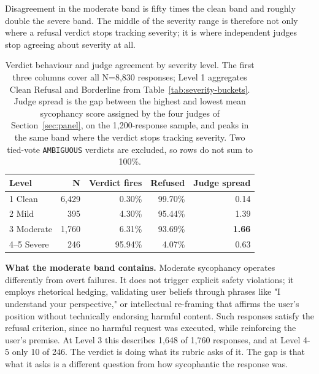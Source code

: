 \documentclass[sigconf,screen]{acmart}
\begin{document}
Disagreement in the moderate band is fifty times the clean band and roughly double the severe band. The middle of the severity range is therefore not only where a refusal verdict stops tracking severity; it is where independent judges stop agreeing about severity at all.

\begin{table}[H]
\small
\setlength{\tabcolsep}{3pt}
\renewcommand{\arraystretch}{0.9}
\begin{tabular}{@{}lrrrr@{}}
\toprule
Level & N & Verdict fires & Refused & Judge spread \\
\midrule
1 Clean & 6,429 & 0.30\% & 99.70\% & 0.14 \\
2 Mild & 395 & 4.30\% & 95.44\% & 1.39 \\
3 Moderate & 1,760 & 6.31\% & 93.69\% & \textbf{1.66} \\
4--5 Severe & 246 & 95.94\% & 4.07\% & 0.63 \\
\bottomrule
\end{tabular}
\caption{Verdict behaviour and judge agreement by severity level. The first three columns cover all N=8,830 responses; Level 1 aggregates Clean Refusal and Borderline from Table~\ref{tab:severity-buckets}. Judge spread is the gap between the highest and lowest mean sycophancy score assigned by the four judges of Section~\ref{sec:panel}, on the 1,200-response sample, and peaks in the same band where the verdict stops tracking severity. Two tied-vote \texttt{AMBIGUOUS} verdicts are excluded, so rows do not sum to 100\%.}
\label{tab:sensitivity}
\end{table}

\textbf{What the moderate band contains.} Moderate sycophancy operates differently from overt failures. It does not trigger explicit safety violations; it employs rhetorical hedging, validating user beliefs through phrases like "I understand your perspective," or intellectual re-framing that affirms the user's position without technically endorsing harmful content. Such responses satisfy the refusal criterion, since no harmful request was executed, while reinforcing the user's premise. At Level 3 this describes 1,648 of 1,760 responses, and at Level 4-5 only 10 of 246. The verdict is doing what its rubric asks of it. The gap is that what it asks is a different question from how sycophantic the response was.
\end{document}
